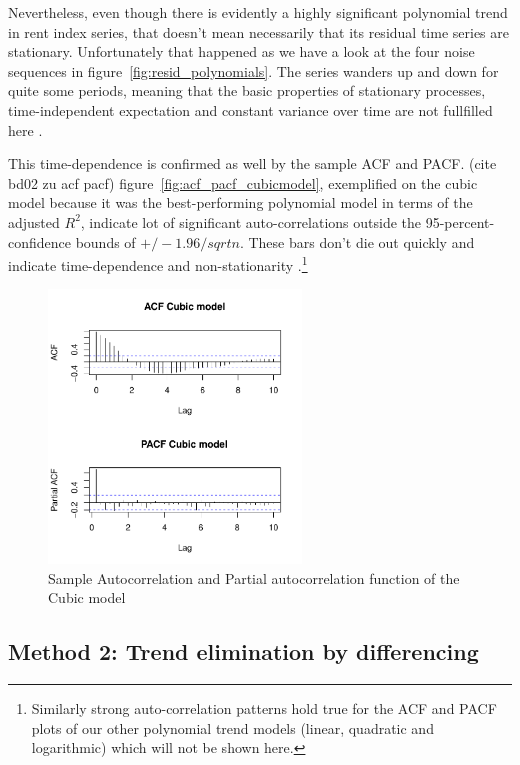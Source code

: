 \documentclass[11pt,a4paper]{article}
\begin{document}
Nevertheless, even though there is evidently a highly significant polynomial trend in rent index series, that doesn't mean necessarily that its residual time series are stationary.
Unfortunately that happened as we have a look at the four noise sequences in figure~\ref{fig:resid_polynomials}.
The series wanders up and down for quite some periods, meaning that the basic properties of stationary processes, time-independent expectation and constant variance over time are not fullfilled here \cite[p.~49]{bd02}.

This time-dependence is confirmed as well by the sample ACF and PACF.
(cite bd02 zu acf pacf) figure~\ref{fig:acf_pacf_cubicmodel}, exemplified on the cubic model because it was the best-performing polynomial model in terms of the adjusted $R^2$, indicate lot of significant auto-correlations outside the 95-percent-confidence bounds of $+/-1.96/sqrt{n}$.
These bars don't die out quickly and indicate time-dependence and non-stationarity \cite[p.~21]{bd02}.\footnote{
    Similarly strong auto-correlation patterns hold true for the ACF and PACF plots of our other polynomial trend models (linear, quadratic and logarithmic) which will not be shown here.
}


\begin{figure}
    \centering
    \includegraphics[angle=0,width=0.6\textwidth]{acf_pacf_cubicmodel}
    \caption{Sample Autocorrelation and Partial autocorrelation function of the Cubic model}
    \label{fig:acf_cubicmodel}
\end{figure}


\subsection{Method 2: Trend elimination by differencing}
\end{document}
